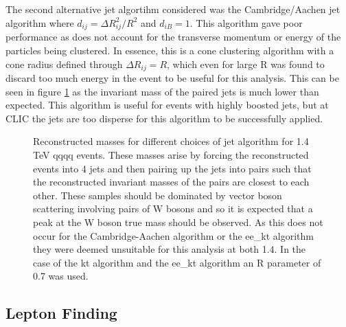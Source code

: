 The second alternative jet algortihm considered was the Cambridge/Aachen jet algorithm where $d_{ij} = {\Delta}R_{ij}^{2}/R^2$ and $d_{iB} = 1$.  This algorithm gave poor performance as does not account for the transverse momentum or energy of the particles being clustered. In essence, this is a cone clustering algorithm with a cone radius defined through ${\Delta}R_{ij} = R$, which even for large R was found to discard too much energy in the event to be useful for this analysis.  This can be seen in figure \ref{fig:invariantmassalgoveto} as the invariant mass of the paired jets is much lower than expected.  This algorithm is useful for events with highly boosted jets, but at CLIC the jets are too disperse for this algorithm to be successfully applied.

\begin{figure}
\centering
{}
\caption[Reconstructed invariant masses for different choices of jet algorithm for 1.4 TeV \nu{\nu}qqqq events.]{Reconstructed masses for different choices of jet algorithm for 1.4 TeV \nu{\nu}qqqq events. These masses arise by forcing the reconstructed events into 4 jets and then pairing up the jets into pairs such that the reconstructed invariant masses of the pairs are closest to each other. These samples should be dominated by vector boson scattering involving pairs of W bosons and so it is expected that a peak at the W boson true mass should be observed. As this does not occur for the Cambridge-Aachen algorithm or the ee\_kt algorithm they were deemed unsuitable for this analysis at both 1.4. In the case of the kt algorithm and the ee\_kt algorithm an R parameter of 0.7 was used.}
\label{fig:invariantmassalgoveto}
\end{figure}

\subsection{Lepton Finding} 
\label{sec:isolatedleptonfinding}

